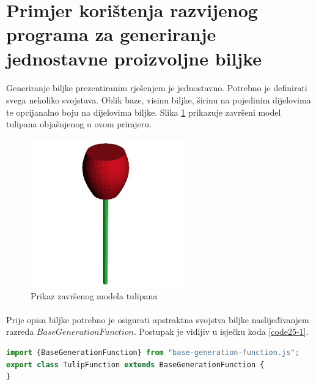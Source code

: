 \documentclass[times, utf8, diplomski]{fer}
\begin{document}
\section{Primjer korištenja razvijenog programa za generiranje jednostavne proizvoljne biljke}
\paragraph{}
Generiranje biljke prezentiranim rješenjem je jednostavno. Potrebno je definirati svega 
nekoliko svojstava. Oblik baze, visinu biljke, širinu na pojedinim dijelovima te opcijanalno 
boju na dijelovima biljke. Slika \ref{fig:21-1} prikazuje završeni model tulipana 
objašnjenog u ovom primjeru.

\begin{figure}[h]
	\centering
	\includegraphics[width=0.6\textwidth]{img/25-1}
	\caption{Prikaz završenog modela tulipana}
	\label{fig:21-1}
\end{figure}

\paragraph{}
Prije opisa biljke potrebno je osigurati apstraktna svojstva biljke naslijeđivanjem razreda
$BaseGenerationFunction$. Postupak je vidljiv u isječku koda \ref{code25-1}.

\begin{lstlisting}[language=Javascript,caption=Naslijeđivanje razreda BaseGenerationFunction,label=code25-1]
import {BaseGenerationFunction} from "base-generation-function.js";
export class TulipFunction extends BaseGenerationFunction {
}
\end{lstlisting}
\end{document}
